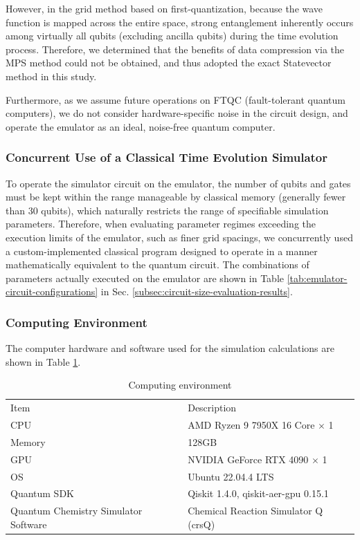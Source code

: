 \documentclass[manuscript_main.tex]{subfiles}
\begin{document}
However, in the grid method based on first-quantization, because the wave
function is mapped across the entire space, strong entanglement inherently
occurs among virtually all qubits (excluding ancilla qubits) during the time
evolution process. Therefore, we determined that the benefits of data
compression via the MPS method could not be obtained, and thus adopted the exact
Statevector method in this study.

Furthermore, as we assume future operations on FTQC (fault-tolerant quantum
computers), we do not consider hardware-specific noise in the circuit design,
and operate the emulator as an ideal, noise-free quantum computer.

\subsubsection{Concurrent Use of a Classical Time Evolution Simulator}
To operate the simulator circuit on the emulator, the number of qubits and gates
must be kept within the range manageable by classical memory (generally fewer
than 30 qubits), which naturally restricts the range of specifiable simulation
parameters. Therefore, when evaluating parameter regimes exceeding the execution
limits of the emulator, such as finer grid spacings, we concurrently used a
custom-implemented classical program designed to operate in a manner
mathematically equivalent to the quantum circuit. The combinations of parameters
actually executed on the emulator are shown in Table
\ref{tab:emulator-circuit-configurations} in Sec.
\ref{subsec:circuit-size-evaluation-results}.

\subsubsection{Computing Environment}
The computer hardware and software used for the simulation calculations are
shown in Table \ref{tab:computing-environment}.

\begin{table}[ht]
    \centering
    \caption{Computing environment}
    \begin{ruledtabular}\begin{tabular}{ll}
        Item & Description \\
        \colrule
        CPU & AMD Ryzen 9 7950X 16 Core $\times$ 1 \\
        Memory & 128GB \\
        GPU & NVIDIA GeForce RTX 4090 $\times$ 1 \\
        OS & Ubuntu 22.04.4 LTS \\
        Quantum SDK & Qiskit 1.4.0, qiskit-aer-gpu 0.15.1 \\
        Quantum Chemistry Simulator Software & Chemical Reaction Simulator Q (crsQ) \cite{website:crsq}
    \end{tabular}\end{ruledtabular}
    \label{tab:computing-environment}
\end{table}
\end{document}
